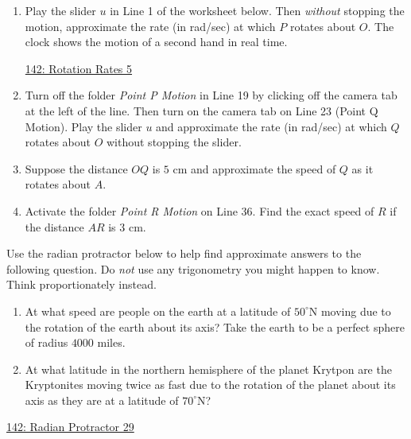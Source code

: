 \documentclass{ximera}
\begin{document}
\begin{question}  \label{Q3245rghh5ty5t}
\begin{enumerate}

\item Play the slider $u$ in Line 1 of the worksheet below. Then \emph{without} stopping the motion, approximate the rate (in rad/sec) at which $P$ rotates about $O$. The clock shows the motion of a second hand in real time.

\begin{onlineOnly}
\begin{center}
\end{center}
\end{onlineOnly}

\href{https://www.desmos.com/calculator/9on2xpcvta}{142: Rotation Rates 5}

\item Turn off the folder \emph{Point P Motion} in Line 19 by clicking off the camera tab at the left of the line. Then turn on the camera tab on Line 23 (Point Q Motion). Play the slider $u$ and approximate the rate (in rad/sec) at which $Q$ rotates about $O$ without stopping the slider.

\item Suppose the distance $OQ$ is $5$ cm and approximate the speed of $Q$ as it rotates about $A$.

\item Activate the folder \emph{Point R Motion} on Line 36. Find the exact speed of $R$ if the distance $AR$ is $3$ cm. 

\end{enumerate}

\end{question}


\begin{question} \label{QLkfdktrtrgvb}
Use the radian protractor below to help find approximate answers to the following question. Do \emph{not} use any trigonometry you might happen to know. Think proportionately instead.

\begin{enumerate}
\item At what speed are people on the earth at a latitude of $50^\circ$N moving due to the rotation of the earth about its axis? Take the earth to be a perfect sphere of radius $4000$ miles.

\item At what latitude in the northern hemisphere of the planet Krytpon are the Kryptonites moving twice as fast due to the rotation of the planet about its axis as they are at a latitude of $70^\circ$N?

\end{enumerate}


\begin{onlineOnly}
\begin{center}
\end{center}
\end{onlineOnly}

\href{https://www.desmos.com/calculator/kjzez98bqn}{142: Radian Protractor 29}

\end{question}
\end{document}
